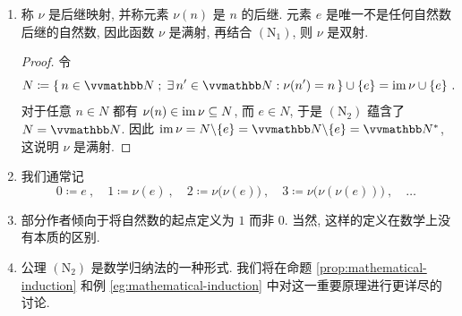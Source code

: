 \begin{remark}
    \begin{enumerate}
        \item 称 \(\nu\) 是后继映射, 并称元素 \(\nu(n)\) 是 \(n\) 的后继. 元素 \(e\) 是唯一不是任何自然数后继的自然数, 因此函数 \(\nu\) 是满射, 再结合 \hyperref[ax:natural-numbers]{\((\mathrm N_1)\)}, 则 \(\nu\) 是双射.
        \begin{proof}
            令
            \[
                N \coloneqq \{\, n \in \N \;;\; \exists\, n' \in \N : \nu(n') = n \,\} \cup \{e\} = \im \nu \cup \{e\}\ .
            \]
            对于任意 \(n \in N\) 都有 \(\nu(n) \in \operatorname{im} \nu \subseteq N\), 而 \(e \in N\), 于是 \hyperref[ax:natural-numbers]{\((\mathrm N_2)\)} 蕴含了 \(N = \N\). 因此 \(\im \nu = N \backslash \{e\} = \N \backslash \{e\} = \N^\ast\), 这说明 \(\nu\) 是满射.
        \end{proof}
        \item 我们通常记
        \[
            0 \coloneqq e\ ,\quad 1 \coloneqq \nu(e)\ ,\quad 2 \coloneqq \nu\bigl(\nu(e)\bigr)\ ,\quad 3 \coloneqq \nu\bigl(\nu(\nu(e))\bigr)\ ,\quad \ldots
        \]
        \item 部分作者倾向于将自然数的起点定义为 \(1\) 而非 \(0\). 当然, 这样的定义在数学上没有本质的区别.
        \item 公理 \hyperref[ax:natural-numbers]{\((\mathrm N_2)\)} 是数学归纳法的一种形式. 我们将在命题 \ref{prop:mathematical-induction} 和例 \ref{eg:mathematical-induction} 中对这一重要原理进行更详尽的讨论.
    \end{enumerate}
\end{remark}

